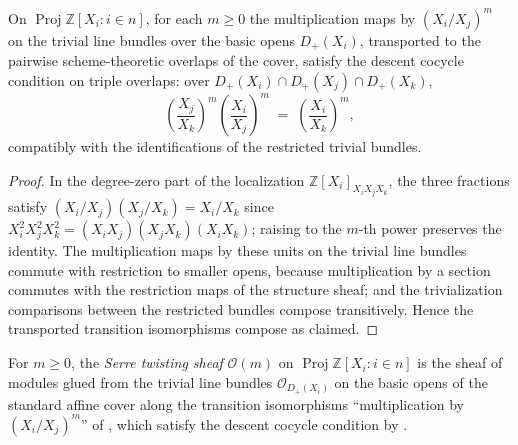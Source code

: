 \begin{lemma}
  \label{lem:serre_twist_cocycle}
  \leanok
  On \(\operatorname{Proj} \mathbb{Z}[X_i : i \in n]\), for each \(m \ge 0\)
  the multiplication maps by \((X_i/X_j)^m\) on the trivial line bundles over
  the basic opens \(D_+(X_i)\), transported to the pairwise scheme-theoretic
  overlaps of the cover, satisfy the descent cocycle condition on triple
  overlaps: over \(D_+(X_i) \cap D_+(X_j) \cap D_+(X_k)\),
  \[
    \left(\frac{X_j}{X_k}\right)^{m}
    \left(\frac{X_i}{X_j}\right)^{m}
    \;=\; \left(\frac{X_i}{X_k}\right)^{m},
  \]
  compatibly with the identifications of the restricted trivial bundles.
\end{lemma}

\begin{proof}
  In the degree-zero part of the localization
  \(\mathbb{Z}[X_i]_{X_i X_j X_k}\), the three fractions satisfy
  \((X_i/X_j)(X_j/X_k) = X_i/X_k\) since
  \(X_i^2 X_j^2 X_k^2 = (X_i X_j)(X_j X_k)(X_i X_k)\); raising to the
  \(m\)-th power preserves the identity.  The multiplication maps by these
  units on the trivial line bundles commute with restriction to smaller
  opens, because multiplication by a section commutes with the restriction
  maps of the structure sheaf; and the trivialization comparisons between
  the restricted bundles compose transitively.  Hence the transported
  transition isomorphisms compose as claimed.
\end{proof}

\begin{definition}
  \label{def:serre_twist}
  \leanok
  For \(m \ge 0\), the \emph{Serre twisting sheaf} \(\mathcal{O}(m)\) on
  \(\operatorname{Proj} \mathbb{Z}[X_i : i \in n]\) is the sheaf of modules
  glued from the trivial line bundles \(\mathcal{O}_{D_+(X_i)}\) on the
  basic opens of the standard affine cover along the transition
  isomorphisms ``multiplication by \((X_i/X_j)^m\)'' of
  , which satisfy the descent cocycle
  condition by .
\end{definition}

